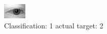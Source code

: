 \begin{figure}[h!]
\begin{center}
\includegraphics[width=0.60\columnwidth]{figures/ID445_class_1_target_2.png}
\end{center}
\caption{ Classification: 1 actual target: 2}
\label{fig:ID445_class_1_target_2}
\end{figure}
